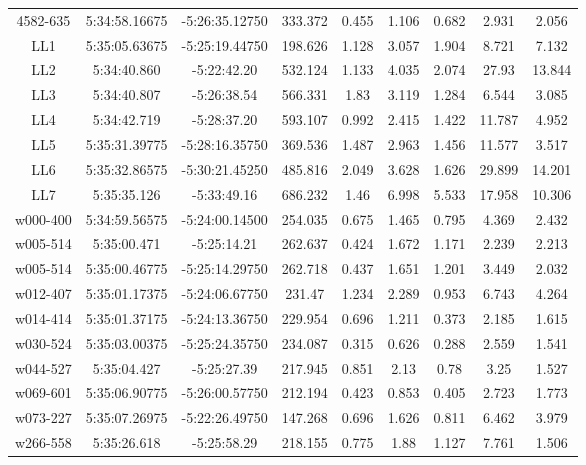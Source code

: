 \begin{table}
\begin{tabular}{ccccccccc}
4582-635 & 5:34:58.16675 & -5:26:35.12750 & 333.372 & 0.455 & 1.106 & 0.682 & 2.931 & 2.056 \\
LL1 & 5:35:05.63675 & -5:25:19.44750 & 198.626 & 1.128 & 3.057 & 1.904 & 8.721 & 7.132 \\
LL2 & 5:34:40.860 & -5:22:42.20 & 532.124 & 1.133 & 4.035 & 2.074 & 27.93 & 13.844 \\
LL3 & 5:34:40.807 & -5:26:38.54 & 566.331 & 1.83 & 3.119 & 1.284 & 6.544 & 3.085 \\
LL4 & 5:34:42.719 & -5:28:37.20 & 593.107 & 0.992 & 2.415 & 1.422 & 11.787 & 4.952 \\
LL5 & 5:35:31.39775 & -5:28:16.35750 & 369.536 & 1.487 & 2.963 & 1.456 & 11.577 & 3.517 \\
LL6 & 5:35:32.86575 & -5:30:21.45250 & 485.816 & 2.049 & 3.628 & 1.626 & 29.899 & 14.201 \\
LL7 & 5:35:35.126 & -5:33:49.16 & 686.232 & 1.46 & 6.998 & 5.533 & 17.958 & 10.306 \\
w000-400 & 5:34:59.56575 & -5:24:00.14500 & 254.035 & 0.675 & 1.465 & 0.795 & 4.369 & 2.432 \\
w005-514 & 5:35:00.471 & -5:25:14.21 & 262.637 & 0.424 & 1.672 & 1.171 & 2.239 & 2.213 \\
w005-514 & 5:35:00.46775 & -5:25:14.29750 & 262.718 & 0.437 & 1.651 & 1.201 & 3.449 & 2.032 \\
w012-407 & 5:35:01.17375 & -5:24:06.67750 & 231.47 & 1.234 & 2.289 & 0.953 & 6.743 & 4.264 \\
w014-414 & 5:35:01.37175 & -5:24:13.36750 & 229.954 & 0.696 & 1.211 & 0.373 & 2.185 & 1.615 \\
w030-524 & 5:35:03.00375 & -5:25:24.35750 & 234.087 & 0.315 & 0.626 & 0.288 & 2.559 & 1.541 \\
w044-527 & 5:35:04.427 & -5:25:27.39 & 217.945 & 0.851 & 2.13 & 0.78 & 3.25 & 1.527 \\
w069-601 & 5:35:06.90775 & -5:26:00.57750 & 212.194 & 0.423 & 0.853 & 0.405 & 2.723 & 1.773 \\
w073-227 & 5:35:07.26975 & -5:22:26.49750 & 147.268 & 0.696 & 1.626 & 0.811 & 6.462 & 3.979 \\
w266-558 & 5:35:26.618 & -5:25:58.29 & 218.155 & 0.775 & 1.88 & 1.127 & 7.761 & 1.506 \\
\end{tabular}
\end{table}
